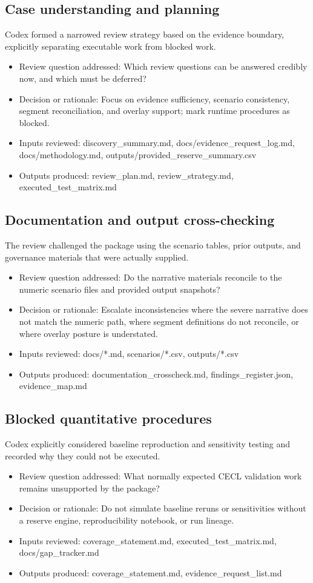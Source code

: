 \documentclass[11pt]{article}
\begin{document}
\subsection*{Case understanding and planning}
Codex formed a narrowed review strategy based on the evidence boundary, explicitly separating executable work from blocked work.
\begin{itemize}
\item Review question addressed: Which review questions can be answered credibly now, and which must be deferred?
\item Decision or rationale: Focus on evidence sufficiency, scenario consistency, segment reconciliation, and overlay support; mark runtime procedures as blocked.
\item Inputs reviewed: discovery\_summary.md, docs/evidence\_request\_log.md, docs/methodology.md, outputs/provided\_reserve\_summary.csv
\item Outputs produced: review\_plan.md, review\_strategy.md, executed\_test\_matrix.md
\end{itemize}
\subsection*{Documentation and output cross-checking}
The review challenged the package using the scenario tables, prior outputs, and governance materials that were actually supplied.
\begin{itemize}
\item Review question addressed: Do the narrative materials reconcile to the numeric scenario files and provided output snapshots?
\item Decision or rationale: Escalate inconsistencies where the severe narrative does not match the numeric path, where segment definitions do not reconcile, or where overlay posture is understated.
\item Inputs reviewed: docs/*.md, scenarios/*.csv, outputs/*.csv
\item Outputs produced: documentation\_crosscheck.md, findings\_register.json, evidence\_map.md
\end{itemize}
\subsection*{Blocked quantitative procedures}
Codex explicitly considered baseline reproduction and sensitivity testing and recorded why they could not be executed.
\begin{itemize}
\item Review question addressed: What normally expected CECL validation work remains unsupported by the package?
\item Decision or rationale: Do not simulate baseline reruns or sensitivities without a reserve engine, reproducibility notebook, or run lineage.
\item Inputs reviewed: coverage\_statement.md, executed\_test\_matrix.md, docs/gap\_tracker.md
\item Outputs produced: coverage\_statement.md, evidence\_request\_list.md
\end{itemize}
\end{document}
